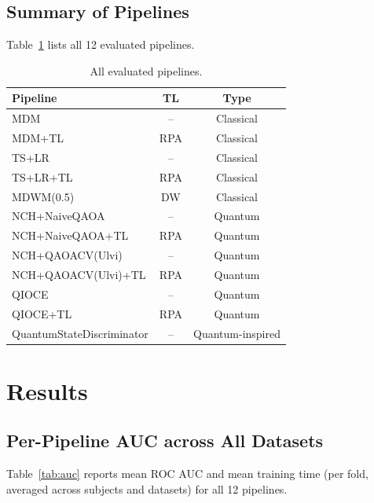 \documentclass{article}
\begin{document}
\subsection{Summary of Pipelines}

Table~\ref{tab:pipelines} lists all 12 evaluated pipelines.

\begin{table}[h]
  \caption{All evaluated pipelines.}
  \label{tab:pipelines}
  \centering
  \setlength{\tabcolsep}{3pt}
  \begin{tabular}{lcc}
    \toprule
    Pipeline & TL & Type \\
    \midrule
    MDM                          & --  & Classical \\
    MDM+TL                       & RPA & Classical \\
    TS+LR                        & --  & Classical \\
    TS+LR+TL                     & RPA & Classical \\
    MDWM(0.5)                    & DW  & Classical \\
    NCH+NaiveQAOA                & --  & Quantum \\
    NCH+NaiveQAOA+TL             & RPA & Quantum \\
    NCH+QAOACV(Ulvi)             & --  & Quantum \\
    NCH+QAOACV(Ulvi)+TL          & RPA & Quantum \\
    QIOCE                        & --  & Quantum \\
    QIOCE+TL                     & RPA & Quantum \\
    QuantumStateDiscriminator    & --  & Quantum-inspired \\
    \bottomrule
  \end{tabular}
\end{table}


\section{Results}
\label{sec:results}

\subsection{Per-Pipeline AUC across All Datasets}

Table~\ref{tab:auc} reports mean ROC AUC and mean training time (per fold,
averaged across subjects and datasets) for all 12 pipelines.
\end{document}
